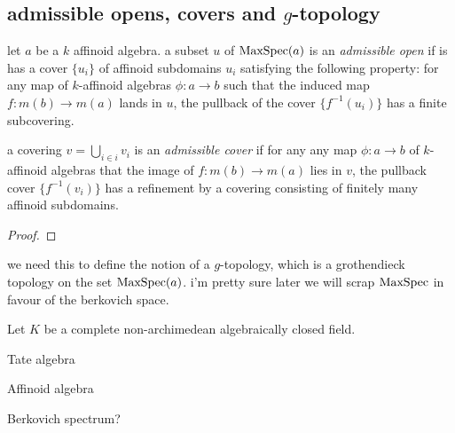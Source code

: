\subsection{admissible opens, covers and $g$-topology} \label{sec:admissible_opens,_covers_and_g-topology}

\begin{definition}
	let $a$ be a  $k$ affinoid algebra. 
	a subset $u$ of $\operatorname{MaxSpec}(a)$ is an \emph{admissible open} if is has a cover $\{u_i\} $ of affinoid subdomains $u_i$ satisfying the following property: 
	for any map of $k$-affinoid algebras $\phi: a \to b$ such that the induced map $f: m(b) \to m(a)$ lands in $u$, the pullback of the cover $\{f^{-1}(u_i)\} $ has a finite subcovering. 


	a covering $v = \bigcup_{i \in  i} v_i$ is an \emph{admissible cover} if for any any map $\phi:a \to b$  of $k$-affinoid algebras that the image of  $f: m(b) \to m(a)$ lies in $v$, the pullback cover $\{f^{-1}(v_i)\} $ has a refinement by a covering consisting of finitely many affinoid subdomains.  
\end{definition}
\begin{proof}
\end{proof}

we need this to define the notion of a $g$-topology, which is a grothendieck topology on the set $\operatorname{MaxSpec}(a)$. 
i'm pretty sure later we will scrap $\operatorname{MaxSpec}$ in favour of the berkovich space.



Let $K$ be a complete non-archimedean algebraically closed field. 

\begin{definition}
	
\end{definition}

\begin{definition}
	Tate algebra 
\end{definition}
\begin{definition}
	Affinoid algebra 
\end{definition}

\begin{definition}
	Berkovich spectrum?
\end{definition}

